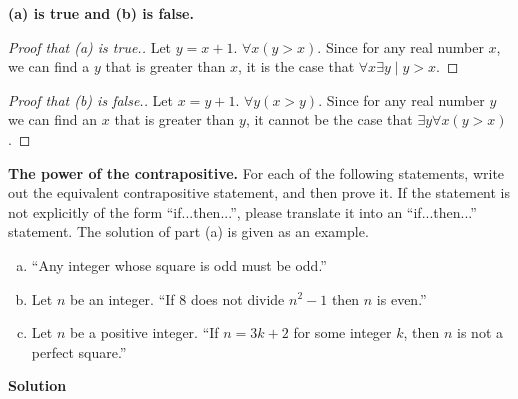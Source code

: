\documentclass[11pt]{scrartcl}
\theoremstyle{dotlessP}
\theoremstyle{dotlessN}
\begin{document}
	\textbf{(a) is true and (b) is false.}

	\begin{proof}
		[Proof that (a) is true.]
		 Let $y = x +  1$. $\forall x(y > x)$. Since for any real number $x$, we can find  a $y$ that is greater than $x$, it is the case that $\forall x \exists y \mid y > x$.
	\end{proof}
	\begin{proof}
		[Proof that (b) is false.]
		Let $x = y + 1$. $\forall y(x > y)$. Since for any real number $y$ we can find an  $x$ that is greater than  $y$, it cannot be the case that  $\exists y \forall x (y > x)$. 
	\end{proof}
\begin{ques}
	\textbf{The power of the contrapositive.} For each of the following statements, write out the equivalent contrapositive statement, and then prove it. If the statement is not explicitly of the form ``if...then...'', please translate it into an ``if...then...'' statement. The solution of part (a) is given as an example.
	\begin{enumerate}[(a)]
		\item ``Any integer whose square is odd must be odd.''
		\item Let $n$ be an integer. ``If 8 does not divide $n^2 - 1$ then $n$ is even.''
		\item Let $n$ be a positive integer. ``If $n=3k+2$ for some integer $k$, then $n$ is not a perfect square.''
	\end{enumerate}
\end{ques}
\textbf{Solution}
\end{document}
